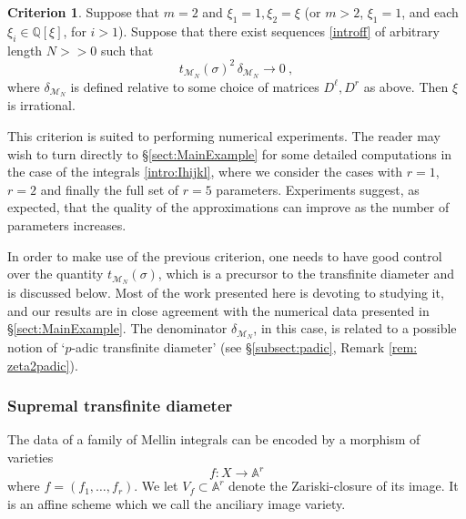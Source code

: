 \documentclass[a4paper,10pt]{amsart}
\theoremstyle{definition}
\newtheorem{crit}[thm]{Criterion}
\theoremstyle{remark}
\numberwithin{equation}{section}
\newcommand{\To}{\longrightarrow}
\newcommand{\Q}{\mathbb Q}
\newcommand{\0}{\color{blue}{\mathsf{0}}}
\begin{document}
\begin{crit} \label{intro:crit}   Suppose that $m=2$ and $\xi_1= 1, \xi_2=\xi$ (or $m>2$, $\xi_1=1$, and each $\xi_i\in \Q[\xi]$, for $i>1$).  Suppose that there exist sequences \eqref{introff} of arbitrary length $N>\!>0$  such that 
\[  t_{\mathcal{M}_N}(\sigma)^2\,   \delta_{\mathcal{M}_N} \rightarrow 0    \ ,  \]
where $\delta_{\mathcal{M}_N}$ is defined relative to some choice of matrices $D^{\ell},D^r$ as above. 
Then $\xi$ is irrational.
\end{crit}
This criterion is suited to performing numerical experiments.  The reader may wish to turn directly to \S \ref{sect:MainExample} for some detailed computations in the case of the
integrals \eqref{intro:Ihijkl}, where we consider the cases with $r=1$, $r=2$ and finally the full set of $r=5$ parameters.  Experiments suggest, as expected, that the quality of the approximations can improve as the number of parameters increases.

In order to make use of the previous criterion, one needs to have good control over the  quantity $t_{\mathcal{M}_N}(\sigma)$, which is a precursor to the  transfinite diameter and is discussed below.
Most of the work presented here is devoting to studying it, and our results are in close agreement with the numerical data presented in \S \ref{sect:MainExample}.
The denominator $\delta_{\mathcal{M}_N}$, in this case, is  related to a possible  notion of `$p$-adic transfinite diameter' (see \S\ref{subsect:padic}, Remark \ref{rem: zeta2padic}).


\subsubsection{Supremal transfinite diameter}The data of a family of Mellin integrals can be encoded by a morphism of varieties
\[ f:  X \To \mathbb{A}^r\]
where $f= (f_1,\ldots, f_r)$.  We let $V_f \subset \mathbb{A}^r$ denote the Zariski-closure of its image. It is an affine scheme which we call the anciliary image variety. 
\end{document}
